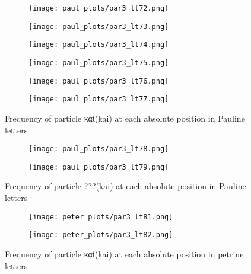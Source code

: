 \documentclass[a4paper]{article}
\renewcommand{\textgreek}[1]{{\selectlanguage{greek}#1}}
\begin{document}
\begin{figure}
\ContinuedFloat
\begin{subfigure}{0.45\textwidth}
\centering
\texttt{[image: paul\_plots/par3\_lt72.png]}
\end{subfigure}
\begin{subfigure}{0.45\textwidth}
\centering
\texttt{[image: paul\_plots/par3\_lt73.png]}
\end{subfigure}
\begin{subfigure}{0.45\textwidth}
\centering
\texttt{[image: paul\_plots/par3\_lt74.png]}
\end{subfigure}
\begin{subfigure}{0.45\textwidth}
\centering
\texttt{[image: paul\_plots/par3\_lt75.png]}
\end{subfigure}
\begin{subfigure}{0.45\textwidth}
\centering
\texttt{[image: paul\_plots/par3\_lt76.png]}
\end{subfigure}
\begin{subfigure}{0.45\textwidth}
\centering
\texttt{[image: paul\_plots/par3\_lt77.png]}
\end{subfigure}
\caption{Frequency of particle \textgreek{καί}(kai) at each absolute position in Pauline letters}
\end{figure}

\begin{figure}
\ContinuedFloat
\begin{subfigure}{0.45\textwidth}
\centering
\texttt{[image: paul\_plots/par3\_lt78.png]}
\end{subfigure}
\begin{subfigure}{0.45\textwidth}
\centering
\texttt{[image: paul\_plots/par3\_lt79.png]}
\end{subfigure}
\caption{Frequency of particle ???(kai) at each absolute position in Pauline letters}
\end{figure}

\begin{figure}
\begin{subfigure}{0.45\textwidth}
\centering
\texttt{[image: peter\_plots/par3\_lt81.png]}
\end{subfigure}
\begin{subfigure}{0.45\textwidth}
\centering
\texttt{[image: peter\_plots/par3\_lt82.png]}
\end{subfigure}
\caption{Frequency of particle \textgreek{καί}(kai) at each absolute position in petrine letters}
\label{peter_kai}
\end{figure}
\end{document}
